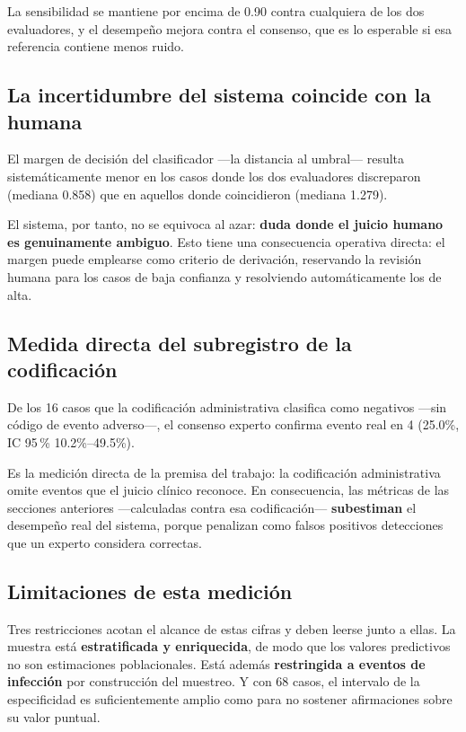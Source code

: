 \documentclass[conference]{IEEEtran}
\begin{document}
La sensibilidad se mantiene por encima de 0.90 contra cualquiera de los dos
evaluadores, y el desempeño mejora contra el consenso, que es lo esperable si
esa referencia contiene menos ruido.

\subsection{La incertidumbre del sistema coincide con la humana}
\label{sec:ambiguedad}
El margen de decisión del clasificador ---la distancia al umbral--- resulta
sistemáticamente menor en los casos donde los dos evaluadores discreparon
(mediana 0.858) que en aquellos donde coincidieron (mediana 1.279).

El sistema, por tanto, no se equivoca al azar: \textbf{duda donde el juicio
humano es genuinamente ambiguo}. Esto tiene una consecuencia operativa
directa: el margen puede emplearse como criterio de derivación, reservando la
revisión humana para los casos de baja confianza y resolviendo
automáticamente los de alta.

\subsection{Medida directa del subregistro de la codificación}
De los 16 casos que la codificación
administrativa clasifica como negativos ---sin código de evento adverso---, el
consenso experto confirma evento real en 4
(25.0\%, IC 95\,\%
10.2\%--49.5\%).

Es la medición directa de la premisa del trabajo: la codificación
administrativa omite eventos que el juicio clínico reconoce. En consecuencia,
las métricas de las secciones anteriores ---calculadas contra esa
codificación--- \textbf{subestiman} el desempeño real del sistema, porque
penalizan como falsos positivos detecciones que un experto considera
correctas.

\subsection{Limitaciones de esta medición}
Tres restricciones acotan el alcance de estas cifras y deben leerse junto a
ellas. La muestra está \textbf{estratificada y enriquecida}, de modo que los
valores predictivos no son estimaciones poblacionales. Está además
\textbf{restringida a eventos de infección} por construcción del muestreo. Y
con 68 casos, el intervalo de la especificidad es
suficientemente amplio como para no sostener afirmaciones sobre su valor
puntual.
\end{document}
